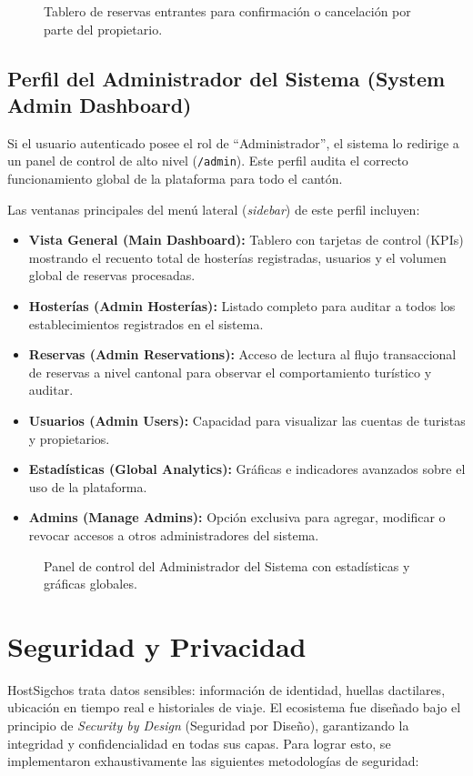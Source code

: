\documentclass[12pt,letterpaper]{report}
\begin{document}
\begin{figure}[H]
  \centering
  \caption{Tablero de reservas entrantes para confirmación o cancelación por parte del propietario.}
\end{figure}

\subsection{Perfil del Administrador del Sistema (System Admin Dashboard)}
Si el usuario autenticado posee el rol de ``Administrador'', el sistema lo redirige a un panel de control de alto nivel (\texttt{/admin}). Este perfil audita el correcto funcionamiento global de la plataforma para todo el cantón.

Las ventanas principales del menú lateral (\textit{sidebar}) de este perfil incluyen:
\begin{itemize}
  \item \textbf{Vista General (Main Dashboard):} Tablero con tarjetas de control (KPIs) mostrando el recuento total de hosterías registradas, usuarios y el volumen global de reservas procesadas.
  \item \textbf{Hosterías (Admin Hosterías):} Listado completo para auditar a todos los establecimientos registrados en el sistema.
  \item \textbf{Reservas (Admin Reservations):} Acceso de lectura al flujo transaccional de reservas a nivel cantonal para observar el comportamiento turístico y auditar.
  \item \textbf{Usuarios (Admin Users):} Capacidad para visualizar las cuentas de turistas y propietarios.
  \item \textbf{Estadísticas (Global Analytics):} Gráficas e indicadores avanzados sobre el uso de la plataforma.
  \item \textbf{Admins (Manage Admins):} Opción exclusiva para agregar, modificar o revocar accesos a otros administradores del sistema.
\end{itemize}

\begin{figure}[H]
  \centering
  \caption{Panel de control del Administrador del Sistema con estadísticas y gráficas globales.}
\end{figure}

\section{Seguridad y Privacidad}
HostSigchos trata datos sensibles: información de identidad, huellas dactilares, ubicación en tiempo real e historiales de viaje. El ecosistema fue diseñado bajo el principio de \textit{Security by Design} (Seguridad por Diseño), garantizando la integridad y confidencialidad en todas sus capas. Para lograr esto, se implementaron exhaustivamente las siguientes metodologías de seguridad:
\end{document}

